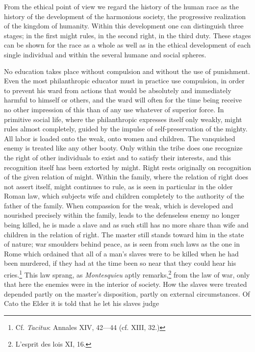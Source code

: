 \documentclass[12pt,a4paper,openany]{book}
\newcommand{\opage}[1]{\marginnote{\footnotesize\textit{[#1]}}}
\begin{document}
From the ethical point of view we regard the history of the human race as
the history of the development of the harmonious society, the progressive
realization of the kingdom of humanity. Within this development one can
distinguish three stages; in the first \opage{95}might rules, in the second
right, in the third duty. These stages can be shown for the race as a
whole as well as in the ethical development of each single individual and
within the several humane and social spheres.

No education takes place without compulsion and without the use of
punishment. Even the most philanthropic educator must in practice use
compulsion, in order to prevent his ward from actions that would be
absolutely and immediately harmful to himself or others, and the ward will
often for the time being receive no other impression of this than of any
use whatever of superior force. In primitive social life, where the
philanthropic expresses itself only weakly, might rules almost completely,
guided by the impulse of self-preservation of the mighty. All labor is
loaded onto the weak, onto women and children. The vanquished enemy is
treated like any other booty. Only within the tribe does one recognize the
right of other individuals to exist and to satisfy their interests, and
this recognition itself has been extorted by might. Right rests originally
on recognition of the given relation of might. Within the family, where
the relation of right does not assert itself, might continues to rule, as
is seen in particular in the older Roman law, which subjects wife and
children completely to the authority of the father of the family. When
compassion for the weak, which is developed and nourished precisely within
the family, leads to the defenseless enemy no longer being killed, he is
made a slave and as \opage{96}such still has no more share than wife and
children in the relation of right. The master still stands toward him in
the state of nature; war smoulders behind peace, as is seen from such laws
as the one in Rome which ordained that all of a man's slaves were to be
killed when he had been murdered, if they had at the time been so near
that they could hear his cries.\footnote[1]{Cf. \emph{Tacitus}: Annales
XIV, 42---44 (cf. XIII, 32.)} This law sprang, as \emph{Montesquieu} aptly
remarks,\footnote[2]{L'esprit des lois XI, 16.} from the law of war, only
that here the enemies were in the interior of society. How the slaves were
treated depended partly on the master's disposition, partly on external
circumstances. Of Cato the Elder it is told that he let his slaves judge
\end{document}
